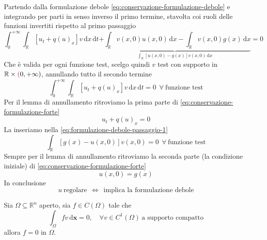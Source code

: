 \documentclass[10pt,a4paper,twoside,openright]{book}
\newcommand{\x}{\mathbf{x}}
\newcommand{\de}{\,\mathrm d}
\newcommand{\dx}{\de x}
\newcommand{\dt}{\de t}
\newcommand{\dxx}{\de \x}
\begin{document}
Partendo dalla formulazione debole \eqref{eq:conservazione-formulazione-debole} e integrando per parti in senso inverso il primo termine, stavolta coi ruoli delle funzioni invertiti rispetto al primo passaggio
\begin{equation}
    \int ^{+\infty }_{0}\int _{\mathbb{R}}[ u_{t}+q(u)_{x}] v\dx\dt\underbrace{+\int _{\mathbb{R}} v(x,0) u(x,0) \dx-\int _{\mathbb{R}} v(x,0) g(x) \dx}_{\int _{\mathbb{R}}[ u(x,0)-g(x)] v(x,0) \dx} =0
    \label{eq:formulazione-debole-passaggio-1}
\end{equation}
Che è valida per ogni funzione test, scelgo quindi $v$ test con supporto in $\mathbb{R} \times \textcolor[rgb]{0.82,0.01,0.11}{(} 0,+\infty)$, annullando tutto il secondo termine
\begin{equation*}
    \int ^{+\infty }_{0}\int _{\mathbb{R}}[ u_{t} +q(u)_{x}] v\dx\dt=0\ \ \forall \ \text{funzione test}
\end{equation*}
Per il lemma di annullamento ritroviamo la prima parte di \eqref{eq:conservazione-formulazione-forte}
\begin{equation*}
    u_{t} +q(u)_{x} =0
\end{equation*}
La inseriamo nella \eqref{eq:formulazione-debole-passaggio-1}
\begin{equation*}
    \int _{\mathbb{R}}[ g(x) -u(x,0)] v(x,0) =0\ \ \forall \ \text{funzione test}
\end{equation*}
Sempre per il lemma di annullamento ritroviamo la seconda parte (la condizione iniziale) di \eqref{eq:conservazione-formulazione-forte}
\begin{equation*}
    u(x,0) =g(x)
\end{equation*}
In conclusione
\begin{equation}
    u\ \text{regolare} \ \ \Leftrightarrow \ \ \text{implica la formulazione debole}
\end{equation}
\begin{theorem}
     Sia $\Omega \subseteq \mathbb{R}^{n}$ aperto, sia $f\in C(\Omega)$ tale che
    \begin{equation}
        \int _{\Omega } fv\dxx=0, \quad \forall  v\in C^{1}(\Omega) \ \text{a supporto compatto}
    \end{equation}
    allora $f=0$ in $\Omega $.
\end{theorem}
\end{document}
